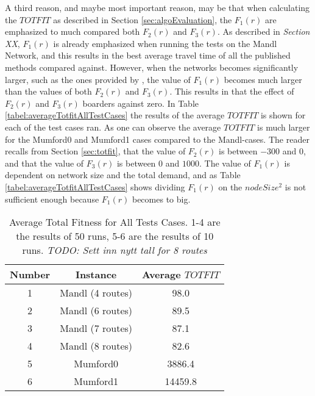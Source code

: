 A third reason, and maybe most important reason, may be that when calculating the $TOTFIT$ as described in Section \vref{sec:algoEvaluation}, the $F_1(r)$ are emphasized to much compared both $F_2(r)$ and $F_3(r)$. As described in \emph{\color{blue} Section XX}, $F_1(r)$ is already emphasized when running the tests on the Mandl Network, and this results in the best average travel time of all the published methods compared against. However, when the networks becomes significantly larger, such as the ones provided by \citet{mumford13}, the value of $F_1(r)$ becomes much larger than the values of both $F_2(r)$ and $F_3(r)$. This results in that the effect of $F_2(r)$ and $F_3(r)$ boarders against zero. In Table \vref{tabel:averageTotfitAllTestCases} the results of the average $TOTFIT$ is shown for each of the test cases ran. As one can observe the average $TOTFIT$ is much larger for the Mumford0 and Mumford1 cases compared to the Mandl-cases. The reader recalls from Section \vref{sec:totfit}, that the value of $F_2(r)$ is between $-300$ and $0$, and that the value of $F_3(r)$ is between $0$ and $1000$. The value of $F_1(r)$ is dependent on network size and the total demand, and as Table \vref{tabel:averageTotfitAllTestCases} shows dividing $F_1(r)$ on the $nodeSize^2$ is not sufficient enough because $F_1(r)$ becomes to big. 

\begin{table}[H]
    \centering
    \hspace*{-1.0cm}
    \begin{tabular}{|c|c|c|}
        \hline
        \textbf{Number} & \textbf{Instance} & \textbf{Average $TOTFIT$}\\
        \hline
        1 & Mandl (4 routes) & 98.0\\
        \hline
        2 & Mandl (6 routes) & 89.5\\
        \hline
        3 & Mandl (7 routes) & 87.1\\
        \hline
        4 & Mandl (8 routes) & 82.6\\
        \hline
        5 & Mumford0 & 3886.4\\
        \hline
        6 & Mumford1 & 14459.8\\
        \hline
    \end{tabular}
    \caption{Average Total Fitness for All Tests Cases. 1-4 are the results of 50 runs, 5-6 are the results of 10 runs. \emph{\color{blue} TODO: Sett inn nytt tall for 8 routes}}
    \label{tabel:averageTotfitAllTestCases}
\end{table}

